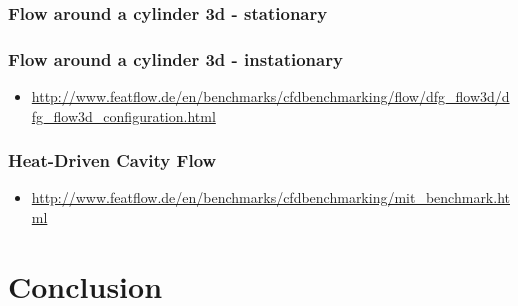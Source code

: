 \documentclass[article,type=msc,colorback,accentcolor=tud2a]{tudthesis}
\begin{document}
      \subsubsection{Flow around a cylinder 3d - stationary}
      \subsubsection{Flow around a cylinder 3d - instationary}
        \begin{itemize}
          \item\url{http://www.featflow.de/en/benchmarks/cfdbenchmarking/flow/dfg_flow3d/dfg_flow3d_configuration.html}
        \end{itemize}

      \subsubsection{Heat-Driven Cavity Flow}
        \begin{itemize}
          \item \url{http://www.featflow.de/en/benchmarks/cfdbenchmarking/mit_benchmark.html}
        \end{itemize}
      
  \section{Conclusion}
\end{document}

